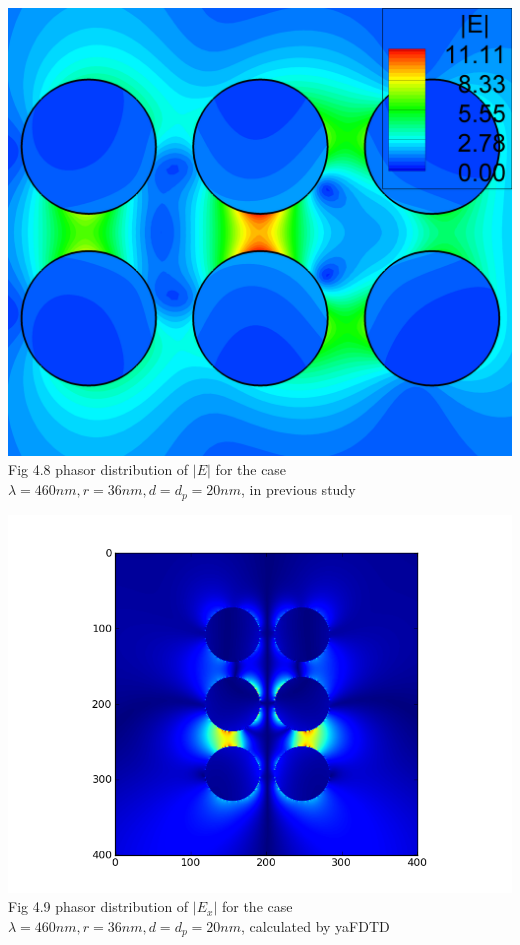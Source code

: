 \documentclass[openany]{book}
\begin{document}
\begin{center}
\includegraphics[scale=0.1]{images/r36.png}\\
Fig 4.8
phasor distribution of $|E|$ for the case $\lambda = 460nm, r = 36nm, d = d_p = 20nm$, in previous study
\end{center}
\begin{center}
\includegraphics[scale=0.8]{images/ex.png}\\
Fig 4.9
phasor distribution of $|E_x|$ for the case $\lambda = 460nm, r = 36nm, d = d_p = 20nm$, calculated by yaFDTD
\end{center}
\end{document}
